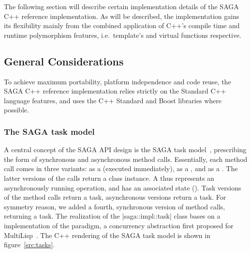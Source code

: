 
The following section will describe certain implementation details
of the SAGA C++ reference implementation. As will be described, the 
implementation gains its flexibility mainly from the combined
application of C++'s compile time and runtime polymorphism features,
i.e.\ template's and virtual functions respective.

\subsection{General Considerations}

  To achieve  maximum portability, platform independence and code
  reuse, the SAGA C++ reference implementation relies strictly on the
  Standard C++ language features, and uses the C++ Standard and Boost
  libraries where possible. 
  
\subsubsection{The SAGA task model}
\label{ssec:tasks}

  A central concept of the SAGA API design is the SAGA task
  model~\cite{saga-paper}, prescribing
  the form of
  synchronous and asynchronous method calls.  Essentially, each method
  call comes in three variants: as a  (executed 
  immediately), as a , and as a .  
  The latter versions of the calls return a  class instance.  A
   thus represents an asynchronously running operation,
  and has an associated state ().  Task versions
  of the method calls return a  task, asynchronous versions
  return a  task. %
  For symmetry reason, we added a fourth, synchronous version of method
  calls, returning a  task.
  The realization of the |saga::impl::task| class bases on a
  implementation of the  paradigm, a concurrency abstraction 
  first proposed for MultiLisp~\cite{futures}.  
  The C++ rendering of the SAGA task model is shown in
  figure~\ref{src:tasks}.

